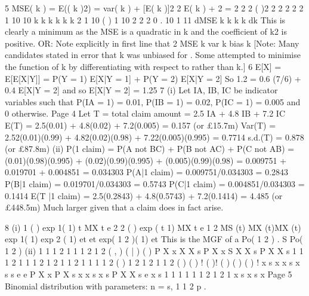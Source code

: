 5 MSE( k ) = E(( k )2) = var( k ) + [E( k )]2 2 E( k ) + 2
=
2 2
2 ( )2 2 2 2 2 2 1
10 10
k
k k k k k
2
1
10
( ) 1 10
2 2 2 0 .
10 1 11
dMSE k k
k k
dk
This is clearly a minimum as the MSE is a quadratic in k and the coefficient of k2 is
positive.
OR: Note explicitly in first line that
2
MSE k var k bias k
[Note: Many candidates stated in error that k was unbiased for . Some attempted
to minimise the function of k by differentiating with respect to rather than k.]
6 E[X] = E[E[X|Y]] = P(Y = 1) E[X|Y = 1] + P(Y = 2) E[X|Y = 2]
So 1.2 = 0.6 (7/6) + 0.4 E[X|Y = 2] and so E[X|Y = 2] = 1.25
7 (i) Let IA, IB, IC be indicator variables such that
P(IA = 1) = 0.01, P(IB = 1) = 0.02, P(IC = 1) = 0.005 and 0 otherwise.
Page 4
Let T = total claim amount = 2.5 IA + 4.8 IB + 7.2 IC
E(T) = 2.5(0.01) + 4.8(0.02) + 7.2(0.005) = 0.157 (or £15.7m)
Var(T) = 2.52(0.01)(0.99) + 4.82(0.02)(0.98) + 7.22(0.005)(0.995) = 0.7714
s.d.(T) = 0.878 (or £87.8m)
(ii) P(1 claim) = P(A not BC) + P(B not AC) + P(C not AB)
= (0.01)(0.98)(0.995) + (0.02)(0.99)(0.995) + (0.005)(0.99)(0.98)
= 0.009751 + 0.019701 + 0.004851 = 0.034303
P(A|1 claim) = 0.009751/0.034303 = 0.2843
P(B|1 claim) = 0.019701/0.034303 = 0.5743
P(C|1 claim) = 0.004851/0.034303 = 0.1414
E(T |1 claim) = 2.5(0.2843) + 4.8(0.5743) + 7.2(0.1414) = 4.485
(or £448.5m)
Much larger given that a claim does in fact arise.



8 (i)
1 ( ) exp{ 1( 1)} t
MX t e
2 2 ( ) exp{ ( t 1)}
MX t e
1 2
MS (t) MX (t)MX (t)
exp{ 1( 1)} exp{ 2 ( 1)} et et
exp{( 1 2 )( 1)} et
This is the MGF of a Po( 1 2 ) .
S Po( 1 2 )
(ii) 1 1 1 2
1 1 1 2
1 2
( , )
( | )
( )
P X x X X s
P X x S X X s
P X X s
1 1 1 2
1 1
1 2
1 2
1 1 2 1 1 1 1 2
( )
1 2 1 2 1 1 2
( ) ( ) ! ( )!
( ) ( ) ( )
!
x s x
x s x
s s
e e
P X x P X s x x s x s
P X X s e x
s
1 1
1 1
1 1 2 1 2
1
x s x s
x
Page 5
Binomial distribution with parameters: n = s, 1
1 2
p .
